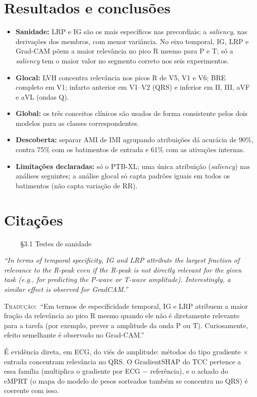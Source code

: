 \documentclass[11pt,a4paper]{article}
\newcommand{\pagechip}[1]{{\setlength{\fboxsep}{1.5pt}\colorbox{cAcc}{\textcolor{white}{\scriptsize\texttt{#1}}}}}
\newenvironment{origquote}{\par\itshape\small}{\par}
\newenvironment{tradquote}{\par\small\textsc{Tradução:}\ }{\par}
\newcommand{\explab}[1]{\par\smallskip{\small\color{cAcc}\textbf{\MakeUppercase{#1}}}\par}
\begin{document}
\section{Resultados e conclusões}
\begin{itemize}
  \item \textbf{Sanidade:} LRP e IG são os mais específicos nas precordiais; a \textit{saliency}, nas derivações dos membros, com menor variância. No eixo temporal, IG, LRP e Grad-CAM põem a maior relevância no pico R mesmo para P e T; só a \textit{saliency} tem o maior valor no segmento correto nos seis experimentos.
  \item \textbf{Glocal:} LVH concentra relevância nos picos R de V5, V1 e V6; BRE completo em V1; infarto anterior em V1--V2 (QRS) e inferior em II, III, aVF e aVL (ondas Q).
  \item \textbf{Global:} os três conceitos clínicos são usados de forma consistente pelos dois modelos para as classes correspondentes.
  \item \textbf{Descoberta:} separar AMI de IMI agrupando atribuições dá acurácia de 90\%, contra 75\% com os batimentos de entrada e 61\% com as ativações internas.
  \item \textbf{Limitações declaradas:} só o PTB-XL; uma única atribuição (\textit{saliency}) nas análises seguintes; a análise glocal só capta padrões iguais em todos os batimentos (não capta variação de RR).
\end{itemize}

\section{Citações}

\begin{citacard}{\pagechip{p. 8} §3.1 Testes de sanidade}
\begin{origquote}“In terms of temporal specificity, IG and LRP attribute the largest fraction of relevance to the R-peak even if the R-peak is not directly relevant for the given task (e.g., for predicting the P-wave or T-wave amplitude). Interestingly, a similar effect is observed for GradCAM.”\end{origquote}
\begin{tradquote}“Em termos de especificidade temporal, IG e LRP atribuem a maior fração da relevância ao pico R mesmo quando ele não é diretamente relevante para a tarefa (por exemplo, prever a amplitude da onda P ou T). Curiosamente, efeito semelhante é observado no Grad-CAM.”\end{tradquote}
\explab{Explicação}
É evidência direta, em ECG, do viés de amplitude: métodos do tipo gradiente $\times$ entrada concentram relevância no QRS. O GradientSHAP do TCC pertence a essa família (multiplica o gradiente por ECG $-$ referência), e o achado do eMPRT (o mapa do modelo de pesos sorteados também se concentra no QRS) é coerente com isso.
\end{citacard}
\end{document}
